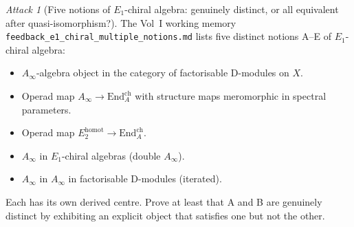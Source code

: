 \documentclass[11pt]{article}
\theoremstyle{definition}
\theoremstyle{remark}
\newtheorem{attack}[thm]{Attack}
\newcommand{\End}{\mathrm{End}}
\newcommand{\Eone}{E_1}
\newcommand{\ch}{\mathrm{ch}}
\begin{document}
\begin{attack}[Five notions of $\Eone$-chiral algebra: genuinely
distinct, or all equivalent after quasi-isomorphism?]
\label{att:five-notions}
The Vol~I working memory \texttt{feedback\_e1\_chiral\_multiple\_notions.md}
lists five distinct notions A--E of $\Eone$-chiral algebra:
\begin{itemize}[leftmargin=*,itemsep=0pt]
\item[(A)] $A_\infty$-algebra object in the category of factorisable
D-modules on $X$.
\item[(B)] Operad map $A_\infty \to \End^{\ch}_A$ with structure
maps meromorphic in spectral parameters.
\item[(C)] Operad map $E_2^{\mathrm{homot}} \to \End^{\ch}_A$.
\item[(D)] $A_\infty$ in $\Eone$-chiral algebras (double $A_\infty$).
\item[(E)] $A_\infty$ in $A_\infty$ in factorisable D-modules
(iterated).
\end{itemize}
Each has its own derived centre. Prove at least that A and B are
genuinely distinct by exhibiting an explicit object that satisfies
one but not the other.
\end{attack}
\end{document}
